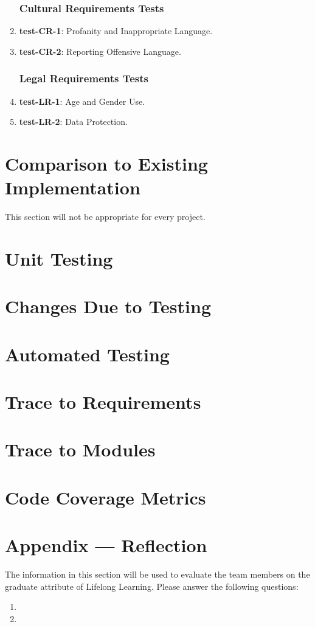 \documentclass[12pt, titlepage]{article}
\begin{document}
\begin{enumerate}
\subsubsection{Cultural Requirements Tests}
	\item{\textbf{test-CR-1}}: Profanity and Inappropriate Language.
	\item{\textbf{test-CR-2}}: Reporting Offensive Language.
\subsubsection{Legal Requirements Tests}
	\item{\textbf{test-LR-1}}: Age and Gender Use.
	\item{\textbf{test-LR-2}}: Data Protection.
\end{enumerate}
	
\section{Comparison to Existing Implementation}	

This section will not be appropriate for every project.

\section{Unit Testing}

\section{Changes Due to Testing}

\section{Automated Testing}
		
\section{Trace to Requirements}
		
\section{Trace to Modules}		

\section{Code Coverage Metrics}




\newpage{}
\section*{Appendix --- Reflection}

The information in this section will be used to evaluate the team members on the
graduate attribute of Lifelong Learning.  Please answer the following questions:

\begin{enumerate}
  \item 
  \item 
\end{enumerate}
\end{document}
